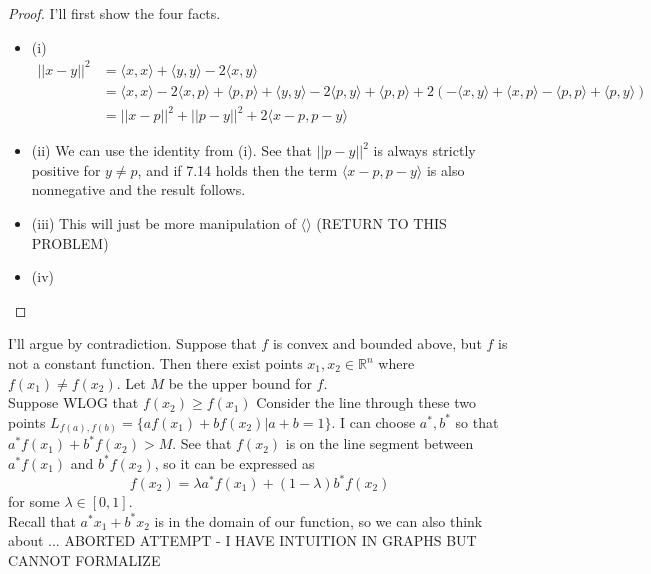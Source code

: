 \documentclass[12pt]{article}
\newenvironment{problem}[2][Problem]{\begin{trivlist}
\item[\hskip \labelsep {\bfseries #1}\hskip \labelsep {\bfseries #2.}]}{\end{trivlist}}
\theoremstyle{definition}
\theoremstyle{definition}
\theoremstyle{definition}
\theoremstyle{definition}
\begin{document}
\begin{problem}{7.4}
\begin{proof} I'll first show the four facts.
\begin{itemize}
\item (i) 
\begin{align*}
||x - y||^2 &= \langle x, x \rangle + \langle y, y \rangle - 2\langle x, y \rangle \\
&= \langle x, x \rangle - 2\langle x, p \rangle + \langle p,p \rangle + \langle y, y \rangle - 2\langle p, y \rangle + \langle p,p \rangle + 2(-\langle x, y \rangle +  \langle x, p \rangle - \langle p, p \rangle + \langle p, y \rangle) \\
&= ||x - p||^2 + ||p-y||^2 + 2\langle x - p, p-y \rangle 
\end{align*}
\item (ii) We can use the identity from (i). See that $||p-y||^2$ is always strictly positive for $ y \neq p$, and if 7.14 holds then the term $\langle x-p, p-y \rangle$ is also nonnegative and the result follows.
\item (iii)
This will just be more manipulation of $\langle \rangle $ (RETURN TO THIS PROBLEM)
\item (iv)
\end{itemize}
\end{proof}
\end{problem}

\begin{problem}{7.13}
I'll argue by contradiction. Suppose that $f$ is convex and bounded above, but $f$ is not a constant function. Then there exist points $x_1, x_2 \in \mathbb{R}^n$ where $f(x_1) \neq f(x_2)$. Let $M$ be the upper bound for $f$. \\ 
Suppose WLOG that $f(x_2) \geq f(x_1)$ Consider the line through these two points $L_{f(a), f(b)} = \{ af(x_1) + bf(x_2) | a+ b = 1 \}$. I can choose $a^*, b^*$ so that $a^*f(x_1) + b^*f(x_2) > M$. 
See that $f(x_2)$ is on the line segment between $a^*f(x_1)$ and  $b^*f(x_2)$, so it can be expressed as 
$$f(x_2) = \lambda a^*f(x_1) + (1-\lambda) b^*f(x_2)$$
for some $\lambda \in [0,1]$.  \\ 
Recall that $a^*x_1 + b^*x_2$ is in the domain of our function, so we can also think about ... ABORTED ATTEMPT - I HAVE INTUITION IN GRAPHS BUT CANNOT FORMALIZE
\end{problem}
\end{document}

